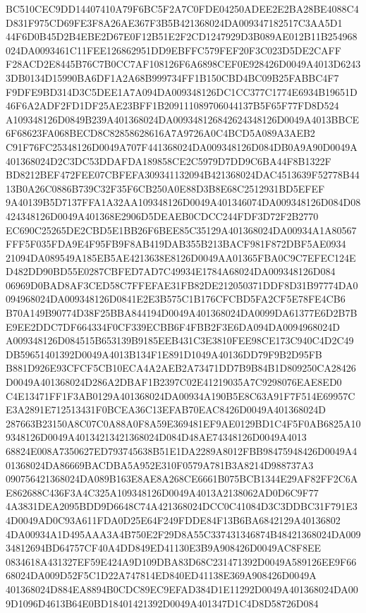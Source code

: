 \documentclass[UTF8,fontset=fandol,zihao=-4,a4paper]{ctexart}
\begin{document}
{{BC510CEC9DD14407410A79F6BC5F2A7C0FDE04250ADEE2E2BA28BE4088C4D831F975CD69FE3F8A26AE367F3B5B421368024DA009347182517C3AA5D1
44F6D0B45D2B4EBE2D67E0F12B51E2F2CD1247929D3B089AE012B11B254968024DA0093461C11FEE126862951DD9EBFFC579FEF20F3C023D5DE2CAFF
F28ACD2E8445B76C7B0CC7AF108126F6A6898CEF0E928426D0049A4013D62433DB0134D15990BA6DF1A2A68B999734FF1B150CBD4BC09B25FABBC4F7
F9DFE9BD314D3C5DEE1A7A094DA009348126DC1CC377C1774E6934B19651D46F6A2ADF2FD1DF25AE23BFF1B209111089706044137B5F65F77FD8D524
A109348126D0849B239A401368024DA009348126842624348126D0049A4013BBCE6F68623FA068BECD8C82858628616A7A9726A0C4BCD5A089A3AEB2
C91F76FC25348126D0049A707F441368024DA009348126D084DB0A9A90D0049A401368024D2C3DC53DDAFDA189858CE2C5979D7DD9C6BA44F8B1322F
BD8212BEF472FEE07CBFEFA309341132094B421368024DAC4513639F52778B4413B0A26C0886B739C32F35F6CB250A0E88D3B8E68C2512931BD5EFEF
9A40139B5D7137FFA1A32AA109348126D0049A401346074DA009348126D084D08424348126D0049A401368E2906D5DEAEB0CDCC244FDF3D72F2B2770
EC690C25265DE2CBD5E1BB26F6BEE85C35129A401368024DA00934A1A80567FFF5F035FDA9E4F95FB9F8AB419DAB355B213BACF981F872DBF5AE0934
21094DA089549A185EB5AE4213638E8126D0049AA01365FBA0C9C7EFEC124ED482DD90BD55E0287CBFED7AD7C49934E1784A68024DA009348126D084
06969D0BAD8AF3CED58C7FFEFAE31FB82DE212050371DDF8D31B97774DA0094968024DA009348126D0841E2E3B575C1B176CFCBD5FA2CF5E78FE4CB6
B70A149B90774D38F25BBA844194D0049A401368024DA0099DA61377E6D2B7BE9EE2DDC7DF664334F0CF339ECBB6F4FBB2F3E6DA094DA0094968024D
A009348126D084515B653139B9185EEB431C3E3810FEE98CE173C940C4D2C49DB59651401392D0049A4013B134F1E891D1049A40136DD79F9B2D95FB
B881D926E93CFCF5CB10ECA4A2AEB2A73471DD7B9B84B1D809250CA28426D0049A401368024D286A2DBAF1B2397C02E41219035A7C9298076EAE8ED0
C4E13471FF1F3AB0129A401368024DA00934A190B5E8C63A91F7F514E69957CE3A2891E712513431F0BCEA36C13EFAB70EAC8426D0049A401368024D
287663B23150A8C07C0A88A0F8A59E369481EF9AE0129BD1C4F5F0AB6825A109348126D0049A40134213421368024D084D48AE74348126D0049A4013
68824E008A7350627ED793745638B51E1DA2289A8012FBB98475948426D0049A401368024DA86669BACDBA5A952E310F0579A781B3A8214D988737A3
090756421368024DA089B163E8AE8A268CE6661B075BCB1344E29AF82FF2C6AE862688C436F3A4C325A109348126D0049A4013A2138062AD0D6C9F77
4A3831DEA2095BDD9D6648C74A421368024DCC0C41084D3C3DDBC31F791E34D0049AD0C93A611FDA0D25E64F249FDDE84F13B6BA6842129A40136802
4DA00934A1D495AAA3A4B750E2F29D8A55C337431346874B48421368024DA00934812694BD64757CF40A4DD849ED41130E3B9A908426D0049AC8F8EE
0834618A431327EF59E424A9D109DBA83D68C231471392D0049A589126EE9F6668024DA009D52F5C1D22A747814ED840ED41138E369A908426D0049A
401368024D884EA8894B0CDC89EC9EFAD384D1E11292D0049A401368024DA009D1096D4613B64E0BD18401421392D0049A401347D1C4D8D58726D084
}}
\end{document}
